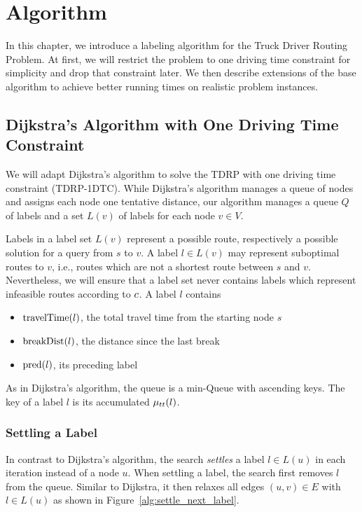 
\chapter{Algorithm}
\label{ch:Algorithm}
In this chapter, we introduce a labeling algorithm for the Truck Driver Routing Problem. At first, we will restrict the problem to one driving time constraint for simplicity and drop that constraint later. We then describe extensions of the base algorithm to achieve better running times on realistic problem instances.

\section{Dijkstra's Algorithm with One Driving Time Constraint\label{sec:dijkstra_csp}}
We will adapt Dijkstra's algorithm to solve the TDRP with one driving time constraint (TDRP-1DTC). While Dijkstra's algorithm manages a queue of nodes and assigns each node one tentative distance, our algorithm manages a queue $Q$ of labels and a set $L(v)$ of labels for each node $v \in V$.

Labels in a label set $L(v)$ represent a possible route, respectively a possible solution for a query from $s$ to $v$. A label $l \in L(v)$ may represent suboptimal routes to $v$, i.e., routes which are not a shortest route between $s$ and $v$. Nevertheless, we will ensure that a label set never contains labels which represent infeasible routes according to $c$. A label $l$ contains

\begin{itemize}
	\item $\operatorname{travelTime}(l)$, the total travel time from the starting node $s$
	\item $\operatorname{breakDist}(l)$, the distance since the last break
	\item $\operatorname{pred}(l)$, its preceding label
\end{itemize}

As in Dijkstra's algorithm, the queue is a min-Queue with ascending keys. The key of a label $l$ is its accumulated $\mu_{tt}(l)$.

\subsection{Settling a Label}
In contrast to Dijkstra's algorithm, the search \emph{settles} a label $l \in L(u)$ in each iteration instead of a node $u$. When settling a label, the search first removes $l$ from the queue. Similar to Dijkstra, it then relaxes all edges $(u,v) \in E$ with $l \in L(u)$ as shown in Figure~\ref{alg:settle_next_label}.

